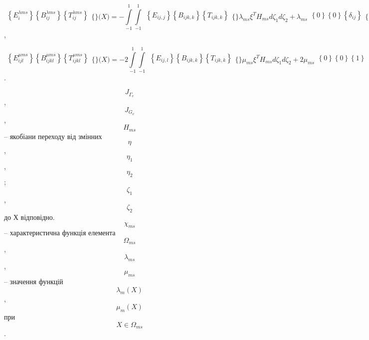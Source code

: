 \[{\begin{matrix}
{\left\{ E_{i}^{\lambda\mathit{\text{ms}}} \right\}\left\{ B_{\mathit{\text{ij}}}^{\lambda\mathit{\text{ms}}} \right\}\left\{ T_{\mathit{\text{ij}}}^{\lambda\mathit{\text{ms}}} \right\}} \\
\end{matrix}{\{\}}(X{) = {- {\int\limits_{- 1}^{1}{{\int\limits_{- 1}^{1}{\begin{matrix}
{\left\{ E_{\mathit{\text{ij}},j} \right\}\left\{ B_{\mathit{\text{ijk}},k} \right\}\left\{ T_{\mathit{\text{ijk}},k} \right\}} \\
\end{matrix}{\{\}}\lambda_{\mathit{\text{ms}}}\xi^{T}H_{\mathit{\text{ms}}}\mathit{d\zeta}_{1}{\mathit{d\zeta}_{2} + \lambda_{\mathit{\text{ms}}}}}}\begin{matrix}
{\left\{ 0 \right\}\left\{ 0 \right\}\left\{ \delta_{\mathit{\text{ij}}} \right\}} \\
\end{matrix}{\{\}}\xi^{T}\chi_{\mathit{\text{ms}}}(X)}}}}}{}\],

\[{\begin{matrix}
{\left\{ E_{\mathit{\text{ijl}}}^{\mu\mathit{\text{ms}}} \right\}\left\{ B_{\mathit{\text{ijkl}}}^{\mu\mathit{\text{ms}}} \right\}\left\{ T_{\mathit{\text{ijkl}}}^{\mu\mathit{\text{ms}}} \right\}} \\
\end{matrix}{\{\}}(X{) = {- 2}}{\int\limits_{- 1}^{1}{{\int\limits_{- 1}^{1}{\begin{matrix}
{\left\{ E_{\mathit{\text{ij}},l} \right\}\left\{ B_{\mathit{\text{ijk}},k} \right\}\left\{ T_{\mathit{\text{ijk}},k} \right\}} \\
\end{matrix}{\{\}}\mu_{\mathit{\text{ms}}}\xi^{T}H_{\mathit{\text{ms}}}\mathit{d\zeta}_{1}{\mathit{d\zeta}_{2} + 2}\mu_{\mathit{\text{ms}}}}}\begin{matrix}
{\left\{ 0 \right\}\left\{ 0 \right\}\left\{ 1 \right\}} \\
\end{matrix}{\{\}}\xi^{T}\chi_{\mathit{\text{ms}}}(X)}}}{}\].

\[J_{\Gamma_{v}}{}\],\[J_{G_{v}}{}\],\[H_{\mathit{\text{ms}}}{}\] --
якобіани переходу від змінних \[\eta{}\], \[\eta_{1}{}\],
\[\eta_{2}{}\];\[\zeta_{1}{}\], \[\zeta_{2}{}\] до Х відповідно.
\[\chi_{\mathit{\text{ms}}}{}\]-- характеристична функція елемента
\[\Omega_{\mathit{\text{ms}}}{}\], \[\lambda_{\mathit{\text{ms}}}{}\],
\[\mu_{\mathit{\text{ms}}}{}\] -- значення функцій
\[{\lambda_{m}(X)}{}\], \[{\mu_{m}(X)}{}\] при
\[{X\in\Omega_{\mathit{\text{ms}}}}{}\].

